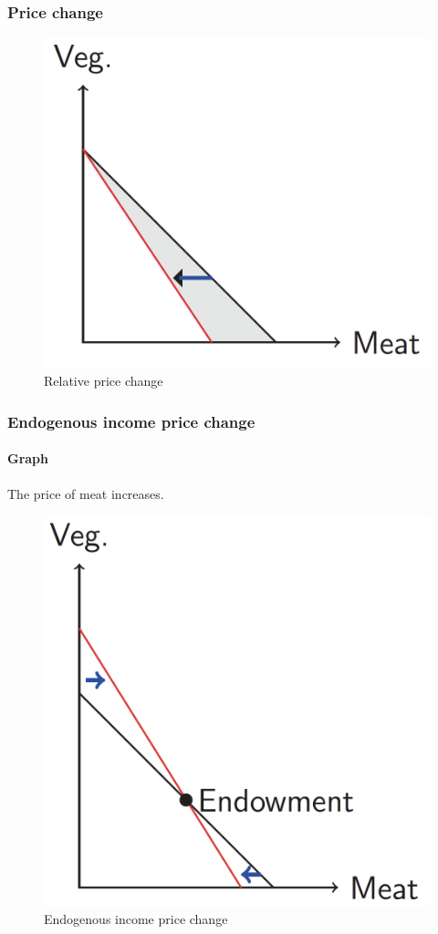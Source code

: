 \documentclass{article}
\begin{document}
	\subsubsection{Price change}
	\begin{figure}[h]
		\centering
		\includegraphics[width=0.5\linewidth]{eco206pic/relative_price_change}
		\caption{Relative price change}
	\end{figure}
	
	\subsubsection{Endogenous income price change}
	\paragraph{Graph} The price of meat increases.
	\begin{figure}[h]
		\centering
		\includegraphics[width=0.5\linewidth]{eco206pic/End_price_change}
		\caption{Endogenous income price change}
	\end{figure}
\end{document}
